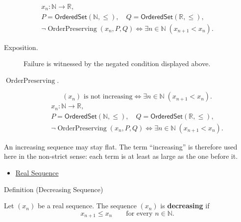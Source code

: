 \begin{remark*}
\[
\begin{gathered}
x_n\colon\mathbb{N}\to\mathbb{R},\\
P=\mathsf{OrderedSet}(\mathbb{N},\leq),\quad
Q=\mathsf{OrderedSet}(\mathbb{R},\leq),\\
\neg\operatorname{OrderPreserving}(x_n,P,Q)
\Longleftrightarrow
\exists n\in\mathbb{N}\;(x_{n+1}<x_n).
\end{gathered}
\]
\end{remark*}
\begin{remark*}
\begin{description}
  \item[Exposition.]
Failure is witnessed by the negated condition displayed above.
  \item[\(\operatorname{OrderPreserving}.\)]
\[
(x_n)\text{ is not increasing}
\Longleftrightarrow
\exists n\in\mathbb{N}\;(x_{n+1}<x_n).
\]
\[
\begin{gathered}
x_n\colon\mathbb{N}\to\mathbb{R},\\
P=\mathsf{OrderedSet}(\mathbb{N},\leq),\quad
Q=\mathsf{OrderedSet}(\mathbb{R},\leq),\\
\neg\operatorname{OrderPreserving}(x_n,P,Q)
\Longleftrightarrow
\exists n\in\mathbb{N}\;(x_{n+1}<x_n).
\end{gathered}
\]
\end{description}
\end{remark*}

\begin{remark*}[Interpretation]
An increasing sequence may stay flat. The term ``increasing'' is therefore
used here in the non-strict sense: each term is at least as large as the one
before it.
\end{remark*}

\begin{dependencies}
\begin{itemize}
  \item \hyperref[def:real-sequence]{Real Sequence}
\end{itemize}
\end{dependencies}


\begin{definitionbox}{Definition (Decreasing Sequence)}
\begin{definition}
\label{def:decreasing-sequence}
Let $(x_n)$ be a real sequence. The sequence $(x_n)$ is
\textbf{decreasing} if
\[
  x_{n+1} \le x_n
  \qquad
  \text{for every } n\in\mathbb{N}.
\]
\end{definition}
\end{definitionbox}

